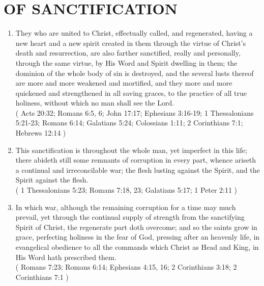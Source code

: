 \documentclass[12pt,a4paper]{book}
\begin{document}
\chapter{OF SANCTIFICATION}
\label{ch-sanc}
\begin{enumerate}
\item They who are united to Christ, effectually called, and regenerated, having a new heart and a new spirit created in them through the virtue of Christ's death and resurrection, are also farther sanctified, really and personally, through the same virtue, by His Word and Spirit dwelling in them; the dominion of the whole body of sin is destroyed, and the several lusts thereof are more and more weakened and mortified, and they more and more quickened and strengthened in all saving graces, to the practice of all true holiness, without which no man shall see the Lord.\\
( Acts 20:32; Romans 6:5, 6; John 17:17; Ephesians 3:16-19; 1 Thessalonians 5:21-23; Romans 6:14; Galatians 5:24; Colossians 1:11; 2 Corinthians 7:1; Hebrews 12:14 )
\item This sanctification is throughout the whole man, yet imperfect in this life; there abideth still some remnants of corruption in every part, whence ariseth a continual and irreconcilable war; the flesh lusting against the Spirit, and the Spirit against the flesh.\\
( 1 Thessalonians 5:23; Romans 7:18, 23; Galatians 5:17; 1 Peter 2:11 )
\item In which war, although the remaining corruption for a time may much prevail, yet through the continual supply of strength from the sanctifying Spirit of Christ, the regenerate part doth overcome; and so the saints grow in grace, perfecting holiness in the fear of God, pressing after an heavenly life, in evangelical obedience to all the commands which Christ as Head and King, in His Word hath prescribed them.\\
( Romans 7:23; Romans 6:14; Ephesians 4:15, 16; 2 Corinthians 3:18; 2 Corinthians 7:1 )
\end{enumerate}
\end{document}
